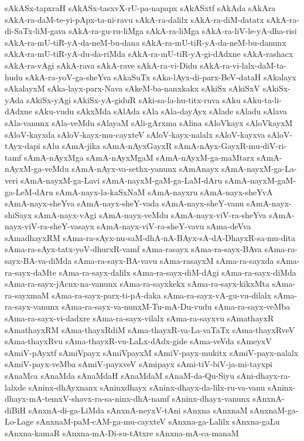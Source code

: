 {sAkASx-tapxraH
sAkASx-tasxvX-rU-pa-napapx
sAkASxtf
sAkAda
sAkAra
sAkA-ra-daM-te-yi-pApx-ta-ni-ravu
sAkA-ra-dalilx
sAkA-ra-diM-datatx
sAkA-ra-di-SaTx-liM-gava
sAkA-ra-gu-ru-liMga
sAkA-ra-liMga
sAkA-ra-liV-le-yA-dha-risi
sAkA-ra-mU-tiR-yA-da-neM-bu-dana
sAkA-ra-mU-tiR-yA-da-neM-bu-danunx
sAkA-ra-mU-tiR-yA-du-da-riMda
sAkA-ra-mU-tiR-yA-gi-dAdxne
sAkA-rashacx
sAkA-ra-vAgi
sAkA-rava
sAkA-rave
sAkA-ra-vi-Didu
sAkA-ra-vi-lalx-daM-ta-hudu
sAkA-ra-yoV-ga-sheYva
sAkaSuTx
sAka-lAyx-di-parx-BeV-dataH
sAkalayx
sAkalayxM
sAka-layx-parx-Nava
sAkeM-ba-nanxkakx
sAkiSx
sAkiSxV
sAkiSx-yAda
sAkiSx-yAgi
sAkiSx-yA-giduR
sAki-sa-la-hu-titx-ruva
sAku
sAku-ta-li-dAdxne
sAku-vudu
sAkxMda
sAlAda
sAla
sAla-dayAyx
sAlade
sAladu
sAlava
sAla-vanunx
sAla-veMdu
sAlayaM
sAli-gArxma
sAlina
sAloVkayx
sAloVkayxM
sAloV-kayxda
sAloV-kayx-mu-cayxteV
sAloV-kayx-nalalx
sAloV-kayxva
sAloV-tAyx-dapi
sAlu
sAmA-jika
sAmA-nAyxGayxR
sAmA-nAyx-GayxR-mu-diV-ri-tamf
sAmA-nAyxMga
sAmA-nAyxMgaM
sAmA-nAyxM-ga-maMtarx
sAmA-nAyxM-ga-veMdu
sAmA-nAyx-va-sethx-yanunx
sAmAnayx
sAmA-nayxM-ga-La-veri
sAmA-nayxM-ga-Lavi
sAmA-nayxM-gaM-ga-LaM-dAru
sAmA-nayxM-gaM-ga-LeM-dAru
sAmA-nayx-la-kaSxNaM
sAmA-nayxru
sAmA-nayx-sheYvA
sAmA-nayx-sheYva
sAmA-nayx-sheY-vada
sAmA-nayx-sheY-vanu
sAmA-nayx-shiSayx
sAmA-nayx-vAgi
sAmA-nayx-veMdu
sAmA-nayx-viV-ra-sheYva
sAmA-nayx-viV-ra-sheY-vasayx
sAmA-nayx-viV-ra-sheY-vavu
sAma-deVva
sAmadhayxRM
sAma-ra-sAyx-nu-saM-dhA-nA-BAyx-sA-dA-DhayxR-sa-mu-dita
sAma-ra-sAyx-tatx-yoV-dhurxR-vamf
sAma-rasayx
sAma-ra-sayx-BAva
sAma-ra-sayx-BA-va-diMda
sAma-ra-sayx-BA-vavu
sAma-rasayxM
sAma-ra-sayxda
sAma-ra-sayx-daMte
sAma-ra-sayx-dalilx
sAma-ra-sayx-diM-dAgi
sAma-ra-sayx-diMda
sAma-ra-sayx-jAcnx-na-vanunx
sAma-ra-sayxkekx
sAma-ra-sayx-kikxMta
sAma-ra-sayxmaM
sAma-ra-sayx-parx-ti-pA-daka
sAma-ra-sayx-vA-gu-vu-dilalx
sAma-ra-sayx-vanunx
sAma-ra-sayx-va-nunxM-Tu-mA-Du-vudu
sAma-ra-sayx-veMba
sAma-ra-sayx-vi-dadxre
sAma-ra-sayx-vilalx
sAma-ra-sayxvu
sAmathayxR
sAmathayxRM
sAma-thayxRdiM
sAma-thayxR-va-La-vaTaTx
sAma-thayxRveV
sAma-thayxRvu
sAma-thayxR-vu-LaLx-dAdx-gide
sAma-veVda
sAmeyxV
sAmiV-pAyxtf
sAmiVpayx
sAmiVpayxM
sAmiV-payx-mukitx
sAmiV-payx-nalalx
sAmiV-payx-veMba
sAmiV-payxveV
sAmipayx
sAmi-tiV-biV-ja-mi-tayxpi
sAnaMca
sAnaMda
sAnaMdaH
sAnaMdaM
sAnaM-da-Qu-Siyu
sAni-dhayx-ra-lalxde
sAninx-dhAyxnanx
sAninxdhayx
sAninx-dhayx-da-lilx-ru-va-vanu
sAninx-dhayx-mA-temxV-shavx-ra-sa-ninx-dhA-namf
sAninx-dhayx-vanunx
sAnxnA-diBiH
sAnxnA-di-ga-LiMda
sAnxnA-neyxV-tAni
sAnxna
sAnxnaM
sAnxnaM-ga-Lo-Lage
sAnxnaM-paM-cAM-ga-mu-cayxteV
sAnxna-ga-Lalilx
sAnxna-gaLu
sAnxna-kamaR
sAnxna-mA-Di-su-tAtxre
sAnxna-mA-ca-manaM
}
